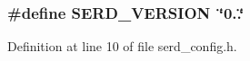 \subsubsection[{\texorpdfstring{S\+E\+R\+D\+\_\+\+V\+E\+R\+S\+I\+ON}{SERD_VERSION}}]{\setlength{\rightskip}{0pt plus 5cm}\#define S\+E\+R\+D\+\_\+\+V\+E\+R\+S\+I\+ON~\char`\"{}0..\char`\"{}}\hypertarget{lib-src_2lv2_2windows_2serd__config_8h_a18233bcddb49feb0aec12cb37de361dc}{}\label{lib-src_2lv2_2windows_2serd__config_8h_a18233bcddb49feb0aec12cb37de361dc}


Definition at line 10 of file serd\+\_\+config.\+h.

